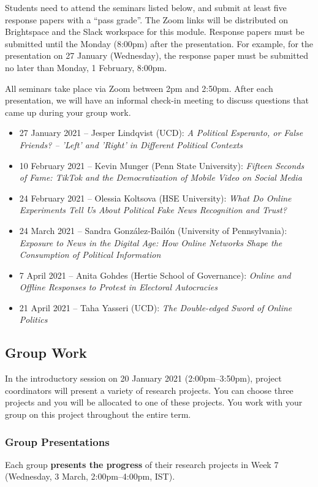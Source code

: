 \documentclass[abstract=on,parskip=full,headings=standardclasses,fontsize=11pt,paper=a4]{scrartcl}
\begin{document}
 
Students need to attend the seminars listed below, and submit at least five response papers with a ``pass grade''. The Zoom links will be distributed on Brightspace and the Slack workspace for this module.  Response papers must be submitted until the Monday (8:00pm) after the presentation. For example, for the presentation on 27 January (Wednesday), the response paper must be submitted no later than Monday, 1 February, 8:00pm.


All seminars take place via Zoom between 2pm and 2:50pm. After each presentation, we will have an informal check-in meeting to discuss questions that came up during your group work.

\begin{itemize}
\item 27 January 2021 -- Jesper Lindqvist (UCD): \textit{A Political Esperanto, or False Friends? – 'Left' and 'Right' in Different Political Contexts}
\item 10 February 2021 -- Kevin Munger (Penn State University): \textit{Fifteen Seconds of Fame: TikTok and the Democratization of Mobile Video on Social Media}
\item 24 February 2021 -- Olessia Koltsova (HSE University): \textit{What Do Online Experiments Tell Us About Political Fake News Recognition and Trust?}
\item 24 March 2021 -- Sandra González-Bailón (University of Pennsylvania): \textit{Exposure to News in the Digital Age: How Online Networks Shape the Consumption of Political Information}
\item 7 April 2021 -- Anita Gohdes (Hertie School of Governance): \textit{Online and Offline Responses to Protest in Electoral Autocracies}
\item 21 April 2021 -- Taha Yasseri (UCD): \textit{The Double-edged Sword of Online Politics}
\end{itemize}


\subsection*{Group Work}

In the introductory session on 20 January 2021 (2:00pm--3:50pm), project coordinators will present a variety of research projects. You can choose three projects and you will be allocated to one of these projects. You work with your group on this project throughout the entire term. 


\subsubsection*{Group Presentations}
\label{presentations}
Each group \textbf{presents the progress} of their research projects in Week 7 (Wednesday, 3 March, 2:00pm--4:00pm, IST).%
\end{document}
